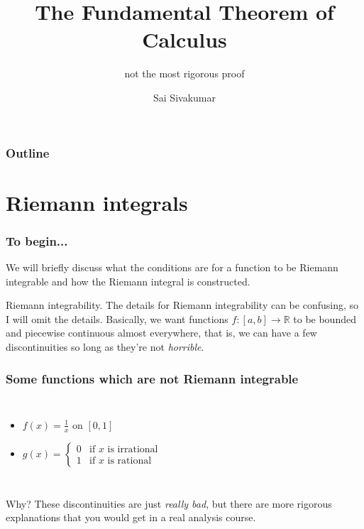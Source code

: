 \documentclass[mathserif]{beamer}
\title[The Fundamental Theorem of Calculus] %
{The Fundamental Theorem of Calculus}
\subtitle{not the most rigorous proof}
\author[Sai Sivakumar] %
{Sai Sivakumar}
\newcommand{\sbr}[1]{\left[#1\right]}
\begin{document}
\frame{\titlepage}

\begin{frame}
\frametitle{Outline}
\tableofcontents
\end{frame}

\section{Riemann integrals}

\begin{frame}
  \frametitle{To begin...}
  We will briefly discuss what the conditions are for a function to be Riemann integrable and how the Riemann integral is constructed.

  Riemann integrability. The details for Riemann integrability can be confusing, so I will omit the details. Basically, we want functions $f : \sbr{a,b} \to \mathbb{R}$ to be bounded and piecewise continuous almost everywhere, that is, we can have a few discontinuities so long as they're not \textit{horrible}.
  
\end{frame}

\begin{frame}
  \frametitle{Some functions which are not Riemann integrable}

  \begin{columns}

    \begin{itemize}
    \item $f(x) = \frac{1}{x}$ on $\sbr{0,1}$
    \item $g(x) = \begin{cases}
      0 & \text{if } x \text{ is irrational} \\
      1 & \text{if } x \text{ is rational}
    \end{cases}$

    \end{itemize}
    

  \end{columns}

  Why? These discontinuities are just \textit{really bad}, but there are more rigorous explanations that you would get in a real analysis course.


\end{frame}
\end{document}
